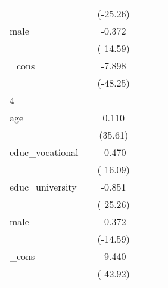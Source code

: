 {\begin{tabular}{l*{5}{c}}
            &                     &    (-25.26)         &                     &                     &                     \\
[1em]
male        &                     &      -0.372\sym{***}&                     &                     &                     \\
            &                     &    (-14.59)         &                     &                     &                     \\
[1em]
\_cons      &                     &      -7.898\sym{***}&                     &                     &                     \\
            &                     &    (-48.25)         &                     &                     &                     \\
\hline
4           &                     &                     &                     &                     &                     \\
age         &                     &       0.110\sym{***}&                     &                     &                     \\
            &                     &     (35.61)         &                     &                     &                     \\
[1em]
educ\_vocational&                     &      -0.470\sym{***}&                     &                     &                     \\
            &                     &    (-16.09)         &                     &                     &                     \\
[1em]
educ\_university&                     &      -0.851\sym{***}&                     &                     &                     \\
            &                     &    (-25.26)         &                     &                     &                     \\
[1em]
male        &                     &      -0.372\sym{***}&                     &                     &                     \\
            &                     &    (-14.59)         &                     &                     &                     \\
[1em]
\_cons      &                     &      -9.440\sym{***}&                     &                     &                     \\
            &                     &    (-42.92)         &                     &                     &                     \\

\end{tabular}}
